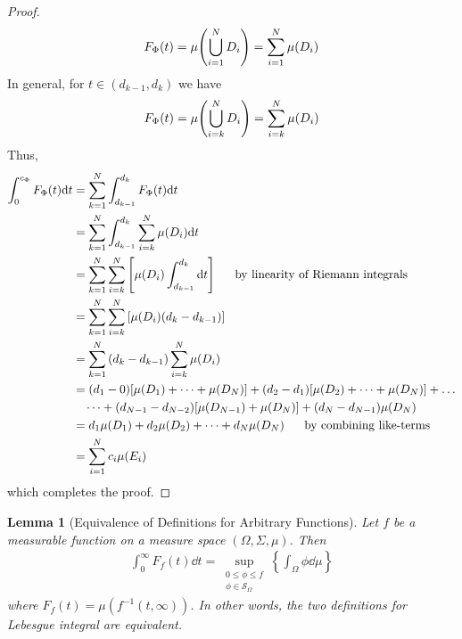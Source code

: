 \documentclass[12pt]{article}
\theoremstyle{plain}
\newtheorem{lemma}{Lemma}
\begin{document}
\begin{proof}
    \begin{align*}
        F_\Phi(t) = \mu\qty(\bigcup_{i=1}^ND_i) = \sum_{i=1}^N \mu(D_i)
    \end{align*}
    In general, for $t \in (d_{k-1}, d_k)$ we have
    \begin{align*}
        F_\Phi(t) = \mu\qty(\bigcup_{i=k}^N D_i) = \sum_{i=k}^N \mu(D_i)
    \end{align*}
    Thus,
    \begin{align*}
        \int_0^{c_\Phi} F_\Phi(t) \dd t &= \sum_{k = 1}^N \int_{d_{k - 1}}^{d_k} F_\Phi(t) \dd t \\
        &= \sum_{k=1}^N\int_{d_{k-1}}^{d_k}\sum_{i=k}^N \mu(D_i) \dd t \\
        &= \sum_{k=1}^N \sum_{i=k}^N \qty[\mu(D_i) \int_{d_{k-1}}^{d_k} \dd t ]\ \ \ \ \ \text{by linearity of Riemann integrals}\\
        &= \sum_{k=1}^N \sum_{i=k}^N \qty[\mu(D_i)\qty(d_k - d_{k-1})] \\
        &= \sum_{k=1}^N \qty(d_k - d_{k-1}) \sum_{i=k}^N \mu(D_i) \\
        &= (d_1  - 0)\qty[\mu(D_1) + \dots + \mu(D_N)] + (d_2 - d_1)\qty[\mu(D_2) + \dots + \mu(D_N)] + \dots \\
        &\ \ \ \dots + (d_{N-1} - d_{N-2})\qty[\mu(D_{N-1}) + \mu(D_N)] + (d_N - d_{N-1})\mu(D_N) \\
        &= d_1\mu(D_1) + d_2\mu(D_2) + \dots + d_N\mu(D_N)\ \ \ \ \ \text{by combining like-terms} \\
        &= \sum_{i=1}^N c_i \mu(E_i)
    \end{align*}
    which completes the proof.
\end{proof}
\begin{lemma}[Equivalence of Definitions for Arbitrary Functions]
    Let $f$ be a measurable function on a measure space $(\Omega, \Sigma, \mu)$.  Then
    \begin{align*}
        \int_0^\infty F_f(t) \dd t = \sup_{\substack{0 \leq \phi \leq f \\[.05cm] \phi \in \mathcal{S}_\Omega}} \left\{\int_\Omega \phi \dd \mu\right\}
    \end{align*}
    where $F_f(t) = \mu(f^{-1}(t, \infty))$.  In other words, the two definitions for Lebesgue integral are equivalent.
\end{lemma}
\end{document}
